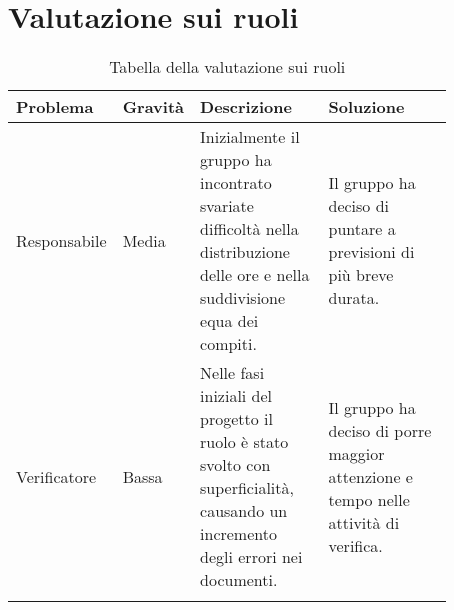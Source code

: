 \section{Valutazione sui ruoli}
\begin{center}
    \renewcommand{\arraystretch}{1.25}
\begin{table}[H]
    \centering
    \begin{longtable}{|p{0.16\linewidth}|p{0.11\linewidth}|p{0.3\linewidth}|p{0.3\linewidth}|}
   \hline
    \rowcolor[HTML]{036400}
    {\color[HTML]{EFEFEF} \textbf{Problema}} & {\color[HTML]{EFEFEF} \textbf{Gravità}} & {\color[HTML]{EFEFEF} \textbf{Descrizione}} & {\color[HTML]{EFEFEF} \textbf{Soluzione}} \\ \hline
    \rowcolor[HTML]{EFEFEF}
    Responsabile & Media & Inizialmente il gruppo ha incontrato svariate difficoltà nella distribuzione delle ore e nella suddivisione equa dei compiti. & Il gruppo ha deciso di puntare a previsioni di più breve durata. \\ \hline
    \rowcolor[HTML]{C0C0C0}
    Verificatore & Bassa & Nelle fasi iniziali del progetto il ruolo è stato svolto con superficialità, causando un incremento degli errori nei documenti. & Il gruppo ha deciso di porre maggior attenzione e tempo nelle attività di verifica. \\ \hline
    \caption{Tabella della valutazione sui ruoli}
    \end{longtable}

\end{table}
\end{center}


